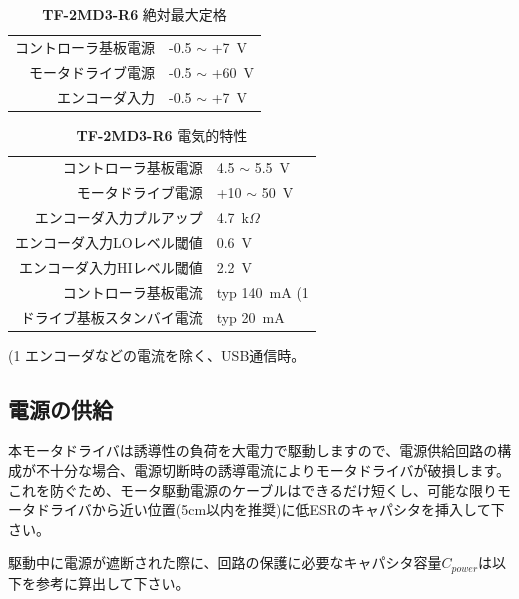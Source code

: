 \documentclass[11pt,a4j,openany,fleqn]{jbook}
\begin{document}
\begin{table}[H]
\caption{{\bf TF-2MD3-R6} 絶対最大定格}
\label{tb:abs_max6}
\centering\begin{tabular}{rl}
\toprule
コントローラ基板電源 & -0.5 $\sim$ +7~V \\
モータドライブ電源 & -0.5 $\sim$ +60~V \\
\midrule
エンコーダ入力 & -0.5 $\sim$ +7~V \\
\bottomrule
\end{tabular}
\end{table}

\begin{table}[H]
\caption{{\bf TF-2MD3-R6} 電気的特性}
\label{tb:el_char6}
\centering\begin{tabular}{rl}
\toprule
コントローラ基板電源 & 4.5 $\sim$ 5.5~V \\
モータドライブ電源 & +10 $\sim$ 50~V \\
\midrule
エンコーダ入力プルアップ & 4.7~k$\Omega$ \\
エンコーダ入力LOレベル閾値 & 0.6~V \\
エンコーダ入力HIレベル閾値 & 2.2~V \\
\midrule
コントローラ基板電流 & typ 140~mA {\footnotesize(1} \\
ドライブ基板スタンバイ電流 & typ 20~mA \\
\bottomrule
\end{tabular}
\begin{center}
{\footnotesize\centering (1 エンコーダなどの電流を除く、USB通信時。}
\end{center}
\end{table}

\newpage
\subsection{電源の供給}
\label{sec:電源の供給}

本モータドライバは誘導性の負荷を大電力で駆動しますので、電源供給回路の構成が不十分な場合、電源切断時の誘導電流によりモータドライバが破損します。
これを防ぐため、モータ駆動電源のケーブルはできるだけ短くし、可能な限りモータドライバから近い位置(5cm以内を推奨)に低ESRのキャパシタを挿入して下さい。
\par
駆動中に電源が遮断された際に、回路の保護に必要なキャパシタ容量$C_{power}$は以下を参考に算出して下さい。
\par
\end{document}
